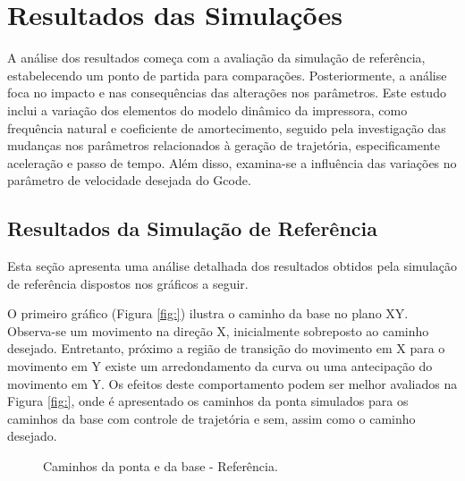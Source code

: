 \section{Resultados das Simulações}
A análise dos resultados começa com a avaliação da simulação de referência, estabelecendo um ponto de partida para comparações. Posteriormente, a análise foca no impacto e nas consequências das alterações nos parâmetros. Este estudo inclui a variação dos elementos do modelo dinâmico da impressora, como frequência natural e coeficiente de amortecimento, seguido pela investigação das mudanças nos parâmetros relacionados à geração de trajetória, especificamente aceleração e passo de tempo. Além disso, examina-se a influência das variações no parâmetro de velocidade desejada do Gcode.

\subsection{Resultados da Simulação de Referência}
Esta seção apresenta uma análise detalhada dos resultados obtidos pela simulação de referência dispostos nos gráficos a seguir.

O primeiro gráfico (Figura \ref{fig:}) ilustra o caminho da base no plano XY. Observa-se um movimento na direção X, inicialmente sobreposto ao caminho desejado. Entretanto, próximo a região de transição do movimento em X para o movimento em Y existe um arredondamento da curva ou uma antecipação do movimento em Y.
Os efeitos deste comportamento podem ser melhor avaliados na Figura \ref{fig:}, onde é apresentado os caminhos da ponta simulados para os caminhos da base com controle de trajetória e sem, assim como o caminho desejado.

\begin{figure}[H]
    \centering
    \hfill
    \hfill
    \hfill
    \caption{Caminhos da ponta e da base - Referência.}
    \label{fig:ref_cam}
\end{figure}


